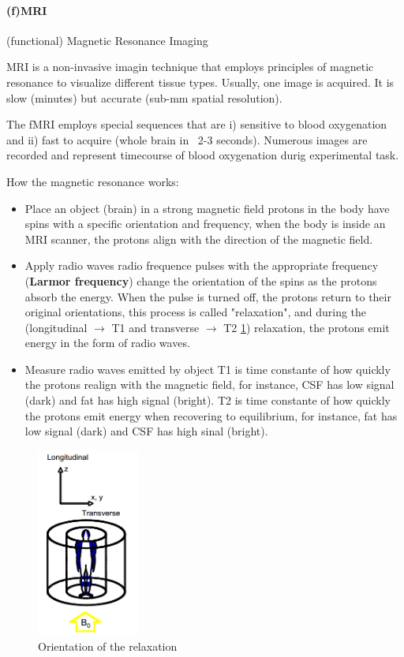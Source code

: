 \documentclass[12pt,article,oneside,a4paper]{memoir}
\begin{document}
\paragraph{(f)MRI} (functional) Magnetic Resonance Imaging

MRI is a non-invasive imagin technique that employs principles of magnetic resonance to visualize different tissue types. Usually, one image is acquired. It is slow (minutes) but accurate (sub-mm spatial resolution).

The fMRI employs special sequences that are i) sensitive to blood oxygenation and ii) fast to acquire (whole brain in ~2-3 seconds). Numerous images are recorded and represent timecourse of blood oxygenation durig experimental task.

How the magnetic resonance works:
\begin{itemize}
\item Place an object (brain) in a strong magnetic field
\subitem protons in the body have spins with a specific orientation and frequency, when the body is inside an MRI scanner, the protons align with the direction of the magnetic field.
\item Apply radio waves
\subitem radio frequence pulses with the appropriate frequency (\textbf{Larmor frequency}) change the orientation of the spins as the protons absorb the energy. When the pulse is turned off, the protons return to their original orientations, this process is called "relaxation", and during the (longitudinal $\rightarrow$ T1 and transverse $\rightarrow$ T2 \ref{fig:orientation-relaxation}) relaxation, the protons emit energy in the form of radio waves.
\item Measure radio waves emitted by object
\subitem T1 is time constante of how quickly the protons realign with the magnetic field, for instance, CSF has low signal (dark) and fat has high signal (bright).
\subitem T2 is time constante of how quickly the protons emit energy when recovering to equilibrium, for instance, fat has low signal (dark) and CSF has high sinal (bright).
\end{itemize}

\begin{figure}
  \centering
  \includegraphics[width=0.3\textwidth]{imgs/mri-longitudinal-transverse.png}
  \caption{Orientation of the relaxation}
  \label{fig:orientation-relaxation}
\end{figure}
\end{document}
